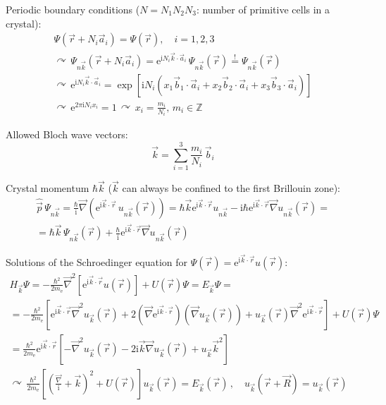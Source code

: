 \documentclass[fontsize=11pt,a4paper]{scrartcl}
\begin{document}
Periodic boundary conditions ($N=N_1N_2N_3$: number of primitive cells in a crystal):
\begin{gather*}
	\Psi(\vec r+N_i\vec a_i)=\Psi(\vec r),\quad i=1,2,3\\
	\curvearrowright\,\Psi_{n\vec k}(\vec r+N_i\vec a_i)=\mathrm{e}^{\mathrm{i} N_i \vec k\cdot\vec a_i}\,\Psi_{n\vec k}(\vec r)\stackrel{!}{=}\Psi_{n\vec k}(\vec r)\\
	\curvearrowright\,\mathrm{e}^{\mathrm{i}N_i\vec k\cdot\vec a_i}=\exp\left[\mathrm{i}N_i(x_1\vec b_1\cdot\vec a_i+x_2\vec b_2\cdot\vec a_i+x_3\vec b_3\cdot\vec a_i)\right]\\
	\curvearrowright\,\mathrm{e}^{2\pi\mathrm{i} N_i x_i}=1\,\curvearrowright\,x_i=\frac{m_i}{N_i},\,m_i\in\mathbb{Z}
\end{gather*}

Allowed Bloch wave vectors:
\[
	\vec k=\sum_{i=1}^3 \frac{m_i}{N_i}\,\vec b_i
\]

Crystal momentum $\hbar\vec k$ ($\vec k$ can always be confined to the first Brillouin zone):
\begin{gather*}
	\hat{\vec p}\,\Psi_{n\vec k}=\frac{\hbar}{\mathrm{i}}\vec\nabla\left(\mathrm{e}^{\mathrm{i}\vec k\cdot\vec r}\,u_{n\vec k}(\vec r)\right)=\hbar\vec k\mathrm{e}^{\mathrm{i}\vec k\cdot\vec r} u_{n\vec k}-\mathrm{i}\hbar\mathrm{e}^{\mathrm{i}\vec k\cdot\vec r}\vec\nabla u_{n\vec k}(\vec r)=\\
	=\hbar\vec k\,\Psi_{n\vec k}(\vec r) + \frac{\hbar}{\mathrm{i}}\mathrm{e}^{\mathrm{i}\vec k\cdot\vec r}\vec\nabla u_{n\vec k}(\vec r)
\end{gather*}

Solutions of the Schroedinger equation for $\Psi(\vec r)=\mathrm{e}^{\mathrm{i}\vec k\cdot\vec r} u(\vec r)$:
\begin{gather*}
	H_{\vec k}\Psi=-\frac{\hbar^2}{2m_\mathrm{e}}\vec\nabla^2\left[\mathrm{e}^{\mathrm{i}\vec k\cdot\vec r} u(\vec r)\right]+U(\vec r)\Psi=E_{\vec k}\Psi=\\
	=-\frac{\hbar^2}{2m_\mathrm{e}}\left[\mathrm{e}^{\mathrm{i}\vec k\cdot\vec r}\vec\nabla^2 u_{\vec k}(\vec r)+2\left(\vec\nabla\mathrm{e}^{\mathrm{i}\vec k\cdot\vec r}\right)\left(\vec\nabla u_{\vec k}(\vec r)\right)+u_{\vec k}(\vec r)\vec\nabla^2\mathrm{e}^{\mathrm{i}\vec k\cdot\vec r}\right]+U(\vec r)\Psi\\
	=\frac{\hbar^2}{2m_\mathrm{e}}\mathrm{e}^{\mathrm{i}\vec k\cdot\vec r}\left[-\vec\nabla^2 u_{\vec k}(\vec r)-2\mathrm{i}\vec k\vec\nabla u_{\vec k}(\vec r)+u_{\vec k}\vec k^2\right]\\
	\curvearrowright\,\frac{\hbar^2}{2m_\mathrm{e}}\left[\left(\frac{\vec\nabla}{\mathrm{i}}+\vec k\right)^2+U(\vec r)\right] u_{\vec k}(\vec r)=E_{\vec k}(\vec r)\,,\quad u_{\vec k}(\vec r+\vec R)=u_{\vec k}(\vec r)
\end{gather*}
\end{document}
